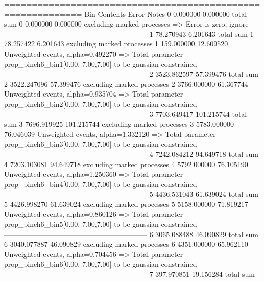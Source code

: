 ============================================================
Bin        Contents        Error           Notes                         
0          0.000000        0.000000        total sum                     
0          0.000000        0.000000        excluding marked processes    
  => Error is zero, ignore      
------------------------------------------------------------
1          78.270943       6.201643        total sum                     
1          78.257422       6.201643        excluding marked processes    
1          159.000000      12.609520       Unweighted events, alpha=0.492270
  => Total parameter prop_binch6_bin1[0.00,-7.00,7.00] to be gaussian constrained
------------------------------------------------------------
2          3523.862597     57.399476       total sum                     
2          3522.247096     57.399476       excluding marked processes    
2          3766.000000     61.367744       Unweighted events, alpha=0.935704
  => Total parameter prop_binch6_bin2[0.00,-7.00,7.00] to be gaussian constrained
------------------------------------------------------------
3          7703.649417     101.215744      total sum                     
3          7696.919925     101.215744      excluding marked processes    
3          5783.000000     76.046039       Unweighted events, alpha=1.332120
  => Total parameter prop_binch6_bin3[0.00,-7.00,7.00] to be gaussian constrained
------------------------------------------------------------
4          7242.084212     94.649718       total sum                     
4          7203.103081     94.649718       excluding marked processes    
4          5792.000000     76.105190       Unweighted events, alpha=1.250360
  => Total parameter prop_binch6_bin4[0.00,-7.00,7.00] to be gaussian constrained
------------------------------------------------------------
5          4436.531043     61.639024       total sum                     
5          4426.998270     61.639024       excluding marked processes    
5          5158.000000     71.819217       Unweighted events, alpha=0.860126
  => Total parameter prop_binch6_bin5[0.00,-7.00,7.00] to be gaussian constrained
------------------------------------------------------------
6          3065.088488     46.090829       total sum                     
6          3040.077887     46.090829       excluding marked processes    
6          4351.000000     65.962110       Unweighted events, alpha=0.704456
  => Total parameter prop_binch6_bin6[0.00,-7.00,7.00] to be gaussian constrained
------------------------------------------------------------
7          397.970851      19.156284       total sum                     
